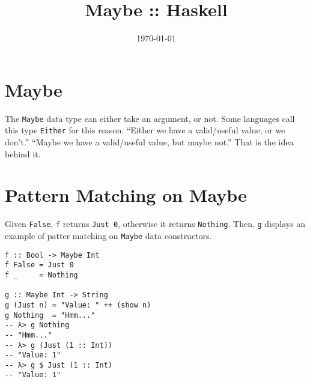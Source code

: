\documentclass[11pt]{article}
\date{\today}
\title{Maybe :: Haskell}
\begin{document}
\maketitle
\tableofcontents


\section{Maybe}
\label{sec:orga9dcb7a}

The \texttt{Maybe} data type can either take an argument, or not. Some
languages call this type \texttt{Either} for this reason. “Either we have a
valid/useful value, or we don't.” “Maybe we have a valid/useful value,
but maybe not.” That is the idea behind it.

\section{Pattern Matching on Maybe}
\label{sec:orgd853d7a}

Given \texttt{False}, \texttt{f} returns \texttt{Just 0}, otherwise it returns \texttt{Nothing}. Then, \texttt{g}
displays an example of patter matching on \texttt{Maybe} data constructors.

\begin{verbatim}
f :: Bool -> Maybe Int
f False = Just 0
f _     = Nothing

g :: Maybe Int -> String
g (Just n) = "Value: " ++ (show n)
g Nothing  = "Hmm..."
-- λ> g Nothing
-- "Hmm..."
-- λ> g (Just (1 :: Int))
-- "Value: 1"
-- λ> g $ Just (1 :: Int)
-- "Value: 1"
\end{verbatim}
\end{document}
